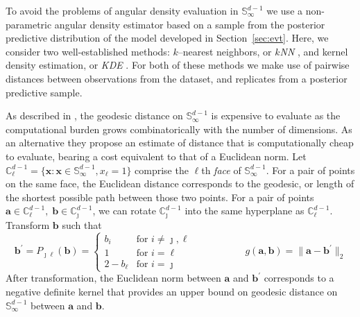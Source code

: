 To avoid the problems of angular density evaluation in $\mathbb{S}_\infty^{d-1}$ 
    we use a non-parametric angular density estimator based on a sample from the 
    posterior predictive distribution of the model developed in 
    Section~\ref{sec:evt}. Here, we consider two well-established
    methods: $k$--nearest neighbors, or \emph{$k$NN} \citep{mack1979}, and 
    kernel density estimation, or \emph{KDE} \citep{parzen1962}.  For both of 
    these methods we make use of pairwise distances between observations 
    from the dataset, and replicates from a posterior predictive sample.  

As described in \cite{trubey:pg}, the  geodesic distance on 
    $\mathbb{S}_{\infty}^{d-1}$ 
    is expensive to evaluate as the computational burden grows 
    combinatorically with the number of dimensions.  As an alternative they propose an 
    estimate of distance that is computationally cheap to evaluate, bearing 
    a cost equivalent to that of a Euclidean norm.
    Let
    ${\mathbb C}_{\ell}^{d-1} = \lbrace \bm{x} : 
        \bm{x} \in {\mathbb S}_{\infty}^{d-1}, x_{\ell} = 1\rbrace$
    comprise the $\ell$th \emph{face} of $\mathbb{S}_{\infty}^{d-1}$.  For a 
    pair of points on the same face, the Euclidean distance corresponds to the
    geodesic, or length of the shortest possible path between those two points.  
    For a pair of points 
    $\bm{a} \in \mathbb{C}_{\ell}^{d-1},\;\bm{b}\in\mathbb{C}_{\jmath}^{d-1}$,
    we can rotate $\mathbb{C}_{\jmath}^{d-1}$ into the same hyperplane as 
    $\mathbb{C}_{\ell}^{d-1}$.  Transform $\bm{b}$ such that %
    \begin{equation}
        \label{eqn:rotation}
        \bm{b}^{\prime} = P_{\jmath\ell}(\bm{b}) = 
        \begin{cases}
            b_{i} &\text{for }i\neq \jmath,\ell\\
            1 &\text{for }i = \ell\\
            2 - b_{\ell} &\text{for }i = \jmath
        \end{cases}\;\hspace{2cm}\;
        g(\bm{a},\bm{b}) = \lVert \bm{a} - \bm{b}^{\prime}\rVert_2
    \end{equation}
    After transformation, the Euclidean norm between $\bm{a}$ and 
    $\bm{b}^{\prime}$ corresponds to a negative definite kernel that
    provides an upper bound on geodesic distance on 
    $\mathbb{S}_{\infty}^{d-1}$ between $\bm{a}$ and $\bm{b}$.

